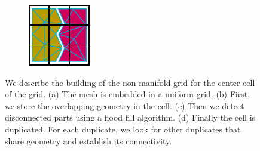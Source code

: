\begin{figure}[!h]
\begin{subfigure}[b]{0.20\linewidth}
		\caption{\label{fig:buildNMG3}}
	\end{subfigure}
	\hfill
	\begin{subfigure}[b]{0.20\linewidth}
		\centering
		\includegraphics[width=\linewidth]{images/cutting-mig2015/buildNMG_4.pdf}
		\caption{\label{fig:buildNMG4}}
	\end{subfigure}
	\caption[Frame-based cutting: Non-manifold grid building]{\label{fig:nonmanifoldgridbuilding}
		We describe the building of the non-manifold grid for the center cell of the grid. (a) The mesh is embedded in a uniform grid. (b) First, we store the overlapping geometry in the cell. (c) Then we detect disconnected parts using a flood fill algorithm. (d) Finally the cell is duplicated. For each duplicate, we look for other duplicates that share geometry and establish its connectivity.}
\end{figure}

\newpage

